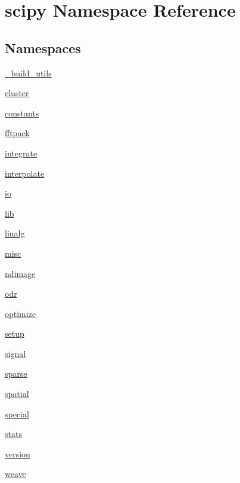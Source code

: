 \hypertarget{namespacescipy}{}\section{scipy Namespace Reference}
\label{namespacescipy}
\subsection*{Namespaces}
\begin{DoxyCompactItemize}
\item 
 \hyperlink{namespacescipy_1_1__build__utils}{\+\_\+build\+\_\+utils}
\item 
 \hyperlink{namespacescipy_1_1cluster}{cluster}
\item 
 \hyperlink{namespacescipy_1_1constants}{constants}
\item 
 \hyperlink{namespacescipy_1_1fftpack}{fftpack}
\item 
 \hyperlink{namespacescipy_1_1integrate}{integrate}
\item 
 \hyperlink{namespacescipy_1_1interpolate}{interpolate}
\item 
 \hyperlink{namespacescipy_1_1io}{io}
\item 
 \hyperlink{namespacescipy_1_1lib}{lib}
\item 
 \hyperlink{namespacescipy_1_1linalg}{linalg}
\item 
 \hyperlink{namespacescipy_1_1misc}{misc}
\item 
 \hyperlink{namespacescipy_1_1ndimage}{ndimage}
\item 
 \hyperlink{namespacescipy_1_1odr}{odr}
\item 
 \hyperlink{namespacescipy_1_1optimize}{optimize}
\item 
 \hyperlink{namespacescipy_1_1setup}{setup}
\item 
 \hyperlink{namespacescipy_1_1signal}{signal}
\item 
 \hyperlink{namespacescipy_1_1sparse}{sparse}
\item 
 \hyperlink{namespacescipy_1_1spatial}{spatial}
\item 
 \hyperlink{namespacescipy_1_1special}{special}
\item 
 \hyperlink{namespacescipy_1_1stats}{stats}
\item 
 \hyperlink{namespacescipy_1_1version}{version}
\item 
 \hyperlink{namespacescipy_1_1weave}{weave}
\end{DoxyCompactItemize}
